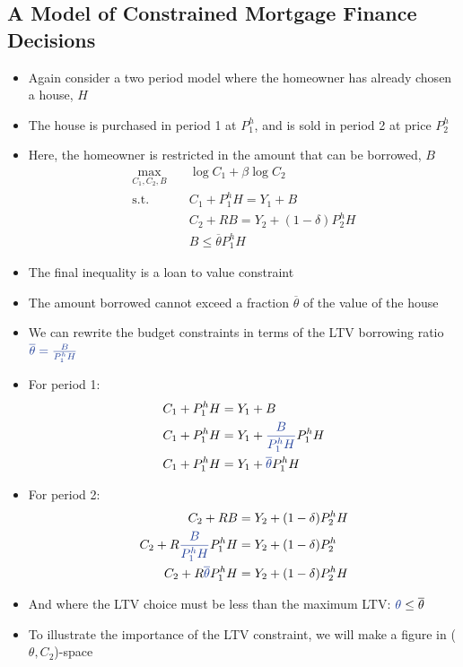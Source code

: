 \documentclass[a4paper]{article}
\begin{document}
\subsection{A Model of Constrained Mortgage Finance Decisions}
	\begin{itemize}
		\item Again consider a two period model where the homeowner has already chosen a house, \( H \)
		\item The house is purchased in period 1 at \( P_1^h \), and is sold in period 2 at price \( P_2^h \)
		\item Here, the homeowner is restricted in the amount that can be borrowed, \( B \)
		\begin{align*}
			\max_{C_1,C_2,B}\quad &\log C_1 + \beta\log C_2\\
			\text{s.t.}\quad &C_1+P_1^h H = Y_1 + B\\
			&C_2 + RB = Y_2 + (1-\delta) P_2^h H\\
			&B \leq \overline{\theta}P_1^h H
		\end{align*}
		\item The final inequality is a \textcolor{myblue}{loan to value constraint}
		\item The amount borrowed cannot exceed a fraction \( \overline{\theta} \) of the value of the house
		\item We can rewrite the budget constraints in terms of the LTV borrowing ratio \( \textcolor{myblue}{\overline{\theta} =\frac{B}{P_1^h H}} \)
		\item For period 1:
		\begin{align*}
			C_1+P_1^h H &= Y_1 + B\\
			C_1+P_1^h H &= Y_1 + \textcolor{myblue}{\frac{B}{P_1^h H}} P_1^h H\\
			C_1+P_1^h H &= Y_1 + \textcolor{myblue}{\overline{\theta}} P_1^h H
		\end{align*}
		\item For period 2:
		\begin{align*}
			C_2 + RB &= Y_2 + (1-\delta) P_2^h H\\
			C_2 + R\textcolor{myblue}{\frac{B}{P_1^h H}} P_1^h H &= Y_2 + (1-\delta) P_2^h \\
			C_2 + R\textcolor{myblue}{\overline{\theta}} P_1^h H &= Y_2 + (1-\delta) P_2^h H
		\end{align*}
		\item And where the LTV choice must be less than the maximum LTV: \( \textcolor{myblue}{\theta} \leq \overline{\theta} \)
		\item To illustrate the importance of the LTV constraint, we will make a figure in (\( \theta,C_2 \))-space

\end{itemize}
\end{document}
